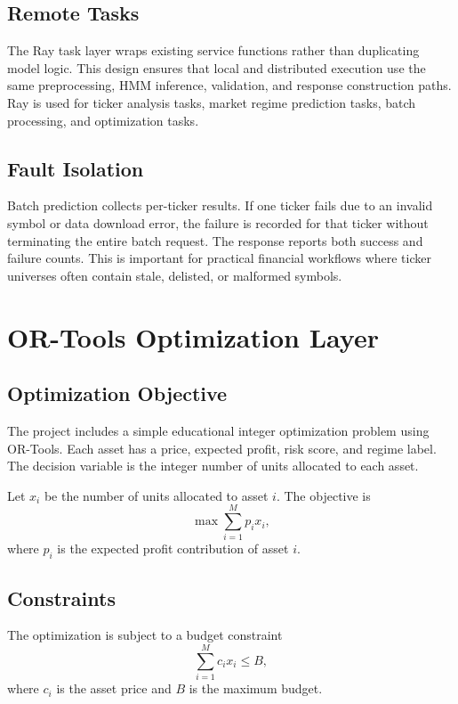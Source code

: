 \documentclass[conference]{IEEEtran}
\begin{document}
\subsection{Remote Tasks}
The Ray task layer wraps existing service functions rather than duplicating model logic. This design ensures that local and distributed execution use the same preprocessing, HMM inference, validation, and response construction paths. Ray is used for ticker analysis tasks, market regime prediction tasks, batch processing, and optimization tasks.

\subsection{Fault Isolation}
Batch prediction collects per-ticker results. If one ticker fails due to an invalid symbol or data download error, the failure is recorded for that ticker without terminating the entire batch request. The response reports both success and failure counts. This is important for practical financial workflows where ticker universes often contain stale, delisted, or malformed symbols.

\section{OR-Tools Optimization Layer}
\subsection{Optimization Objective}
The project includes a simple educational integer optimization problem using OR-Tools. Each asset has a price, expected profit, risk score, and regime label. The decision variable is the integer number of units allocated to each asset.

Let $x_i$ be the number of units allocated to asset $i$. The objective is
\begin{equation}
    \max \sum_{i=1}^{M} p_i x_i,
\end{equation}
where $p_i$ is the expected profit contribution of asset $i$.

\subsection{Constraints}
The optimization is subject to a budget constraint
\begin{equation}
    \sum_{i=1}^{M} c_i x_i \leq B,
\end{equation}
where $c_i$ is the asset price and $B$ is the maximum budget.
\end{document}
